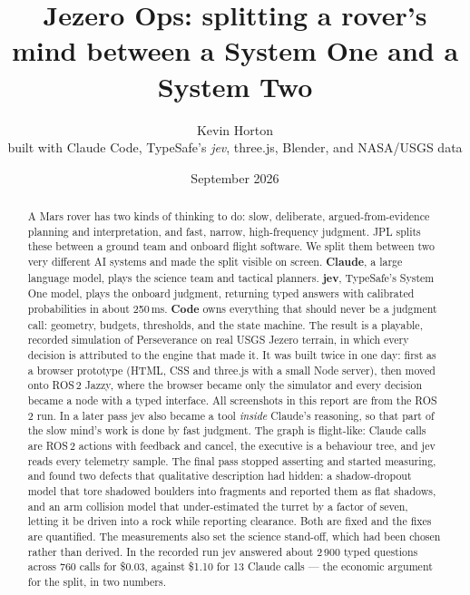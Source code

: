 \documentclass[11pt]{article}
\title{Jezero Ops: splitting a rover's mind between a System One and a System Two}
\author{Kevin Horton\\\small built with Claude Code, TypeSafe's \emph{jev}, three.js, Blender, and NASA/USGS data}
\date{September 2026}
\begin{document}
\maketitle

\begin{center}\end{center}

\begin{abstract}
A Mars rover has two kinds of thinking to do: slow, deliberate, argued-from-evidence planning and interpretation, and fast, narrow, high-frequency judgment. JPL splits these between a ground team and onboard flight software. We split them between two very different AI systems and made the split visible on screen. \textcolor{claude}{\textbf{Claude}}, a large language model, plays the science team and tactical planners. \textcolor{jev}{\textbf{jev}}, TypeSafe's System One model, plays the onboard judgment, returning typed answers with calibrated probabilities in about 250\,ms. \textcolor{code}{\textbf{Code}} owns everything that should never be a judgment call: geometry, budgets, thresholds, and the state machine. The result is a playable, recorded simulation of Perseverance on real USGS Jezero terrain, in which every decision is attributed to the engine that made it. It was built twice in one day: first as a browser prototype (HTML, CSS and three.js with a small Node server), then moved onto ROS\,2 Jazzy, where the browser became only the simulator and every decision became a node with a typed interface. All screenshots in this report are from the ROS\,2 run. In a later pass jev also became a tool \emph{inside} Claude's reasoning, so that part of the slow mind's work is done by fast judgment. The graph is flight-like: Claude calls are ROS\,2 actions with feedback and cancel, the executive is a behaviour tree, and jev reads every telemetry sample. The final pass stopped asserting and started measuring, and found two defects that qualitative description had hidden: a shadow-dropout model that tore shadowed boulders into fragments and reported them as flat shadows, and an arm collision model that under-estimated the turret by a factor of seven, letting it be driven into a rock while reporting clearance. Both are fixed and the fixes are quantified. The measurements also set the science stand-off, which had been chosen rather than derived. In the recorded run jev answered about 2\,900 typed questions across 760 calls for \$0.03, against \$1.10 for 13 Claude calls --- the economic argument for the split, in two numbers.
\end{abstract}
\end{document}
